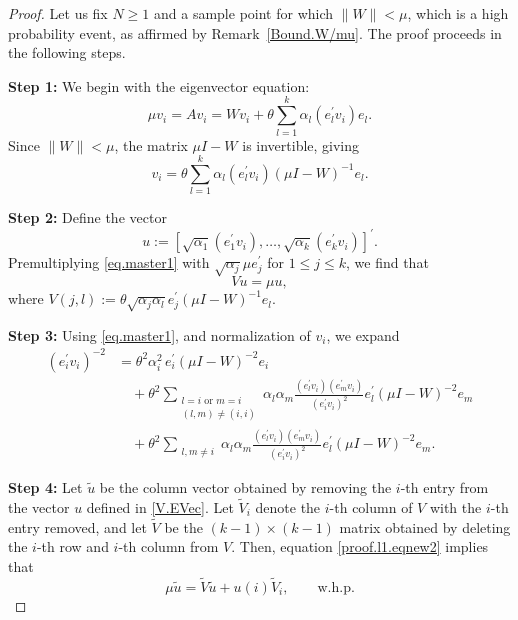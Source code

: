 \documentclass[11pt, reqno]{amsart}
\numberwithin{equation}{section}
\begin{document}
\begin{proof}
Let us fix $N\ge1$ and a sample point for which $\|W\|<\mu$, which is a high probability event, as affirmed by Remark~\ref{Bound.W/mu}. The proof proceeds in the following steps.

\textbf{Step 1:}
We begin with the eigenvector equation:
\begin{equation}\label{proof.l1.eq2}
\mu v_i = A v_i = W v_i + \theta \sum_{l=1}^k \alpha_l (e_l^\prime v_i) e_l.
\end{equation}
Since $\|W\|<\mu$, the matrix $\mu I - W$ is invertible, giving
\begin{equation}\label{eq.master1}
v_i = \theta \sum_{l=1}^k \alpha_l (e_l^\prime v_i)(\mu I - W)^{-1} e_l.
\end{equation}

\textbf{Step 2:}
Define the vector
\begin{equation}\label{V.EVec}
u := [\sqrt{\alpha_1}(e_1^\prime v_i), \ldots, \sqrt{\alpha_k}(e_k^\prime v_i)]^\prime.
\end{equation}
Premultiplying \eqref{eq.master1} with $\sqrt{\alpha_j} \mu e_j^\prime$ for $1 \le j \le k$, we find that
\begin{equation}\label{proof.l1.eqnew2}
V u = \mu u,
\end{equation}
where $V(j,l) := \theta \sqrt{\alpha_j \alpha_l} e_j^\prime (\mu I - W)^{-1} e_l$.

\textbf{Step 3:}
Using \eqref{eq.master1}, and normalization of \(v_i\), we expand
\begin{align}
(e_i^\prime v_i)^{-2} &= \theta^2 \alpha_i^2\, e_i^\prime (\mu I - W)^{-2} e_i \label{eq.master2} \\
&\quad + \theta^2 \sum_{\substack{l=i \text{ or } m=i \\ (l,m)\ne(i,i)}} \alpha_l \alpha_m \frac{(e_l^\prime v_i)(e_m^\prime v_i)}{(e_i^\prime v_i)^2} e_l^\prime (\mu I - W)^{-2} e_m \nonumber \\
&\quad + \theta^2 \sum_{\substack{l,m \ne i}} \alpha_l \alpha_m \frac{(e_l^\prime v_i)(e_m^\prime v_i)}{(e_i^\prime v_i)^2} e_l^\prime (\mu I - W)^{-2} e_m. \nonumber
\end{align}

\textbf{Step 4:}
Let $\tilde u$ be the column vector obtained by removing the $i$-th entry from the vector $u$ defined in \eqref{V.EVec}. Let $\tilde V_i$ denote the $i$-th column of $V$ with the $i$-th entry removed, and let $\tilde V$ be the $(k-1) \times (k-1)$ matrix obtained by deleting the $i$-th row and $i$-th column from $V$. Then, equation \eqref{proof.l1.eqnew2} implies that
\begin{equation}\label{Vtruncated1}
\mu \tilde u = \tilde V \tilde u + u(i)\tilde V_i, \qquad \text{w.h.p.}
\end{equation}


\end{proof}
\end{document}
